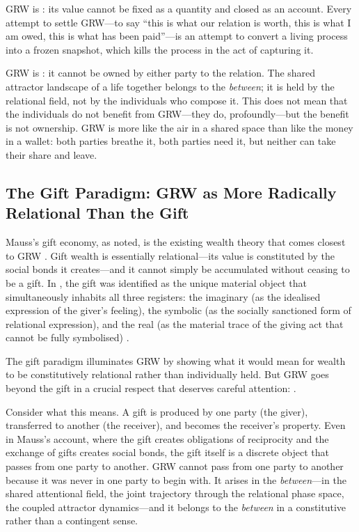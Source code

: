 GRW is : its value cannot be fixed as a quantity and closed as an account. Every attempt to settle GRW---to say ``this is what our relation is worth, this is what I am owed, this is what has been paid''---is an attempt to convert a living process into a frozen snapshot, which kills the process in the act of capturing it.

GRW is : it cannot be owned by either party to the relation. The shared attractor landscape of a life together belongs to the \emph{between}; it is held by the relational field, not by the individuals who compose it. This does not mean that the individuals do not benefit from GRW---they do, profoundly---but the benefit is not ownership. GRW is more like the air in a shared space than like the money in a wallet: both parties breathe it, both parties need it, but neither can take their share and leave.

\subsection{The Gift Paradigm: GRW as More Radically Relational Than the Gift}
\label{p15:subsec:gift_paradigm}

\noindent
Mauss's gift economy, as  noted, is the existing wealth theory that comes closest to GRW \parencite{mauss1990}. Gift wealth is essentially relational---its value is constituted by the social bonds it creates---and it cannot simply be accumulated without ceasing to be a gift. In , the gift was identified as the unique material object that simultaneously inhabits all three registers: the imaginary (as the idealised expression of the giver's feeling), the symbolic (as the socially sanctioned form of relational expression), and the real (as the material trace of the giving act that cannot be fully symbolised) \parencite{paperix}.

The gift paradigm illuminates GRW by showing what it would mean for wealth to be constitutively relational rather than individually held. But GRW goes beyond the gift in a crucial respect that deserves careful attention: .

Consider what this means. A gift is produced by one party (the giver), transferred to another (the receiver), and becomes the receiver's property. Even in Mauss's account, where the gift creates obligations of reciprocity and the exchange of gifts creates social bonds, the gift itself is a discrete object that passes from one party to another. GRW cannot pass from one party to another because it was never in one party to begin with. It arises in the \emph{between}---in the shared attentional field, the joint trajectory through the relational phase space, the coupled attractor dynamics---and it belongs to the \emph{between} in a constitutive rather than a contingent sense.

